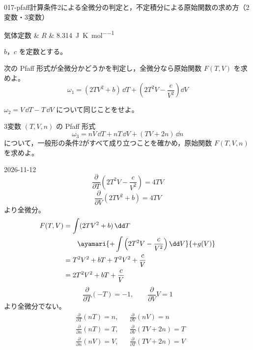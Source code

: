 \documentclass[uplatex,dvipdfmx,a4paper,11pt]{jsarticle}
\begin{document}
\begin{mondai}{017-pfaff}{計算}{条件2による全微分の判定と，不定積分による原始関数の求め方（2変数・3変数）}
\begin{teisuu}
  気体定数 & $R$ & \qty{8.314}{\joule\per\kelvin\per\mole}\\
\end{teisuu}
$b$，$c$ を定数とする。
  \begin{shoumon}
    \item 次の Pfaff 形式が全微分かどうかを判定し，全微分なら原始関数 $F(T,V)$ を求めよ。
    \[ \omega_{1} = (2TV^{2} + b)\,\dd T + \left(2T^{2}V - \frac{c}{V^{2}}\right)\dd V \]
    \item $\omega_{2} = V\,\dd T - T\,\dd V$ について同じことをせよ。
    \item 3変数 $(T,V,n)$ の Pfaff 形式
    \[ \omega_{3} = nV\,\dd T + nT\,\dd V + (TV + 2n)\,\dd n \]
    について，一般形の条件2がすべて成り立つことを確かめ，原始関数 $F(T,V,n)$ を求めよ。
  \end{shoumon}
\begin{kotaeutsushi}{2026-11-12}
\[ \frac{\partial}{\partial T}\left(2T^{2}V-\frac{c}{V^{2}}\right)=4TV \]
\[ \frac{\partial}{\partial V}(2TV^{2}+b)=4TV \]
より全微分。
\begin{align*}
F(T,V)&=\int(2TV^{2}+b)\,\dd T\\
&\qquad\ayamari{+\int\left(2T^{2}V-\frac{c}{V^{2}}\right)\dd V}{+g(V)}\\
&=T^{2}V^{2}+bT+T^{2}V^{2}+\frac{c}{V}\\
&=2T^{2}V^{2}+bT+\frac{c}{V}
\end{align*}
\[ \frac{\partial}{\partial T}(-T)=-1, \qquad \frac{\partial}{\partial V}V=1 \]
より全微分でない。
\begin{align*}
&\frac{\partial}{\partial T}(nT)=n, && \frac{\partial}{\partial V}(nV)=n\\
&\frac{\partial}{\partial n}(nT)=T, && \frac{\partial}{\partial V}(TV+2n)=T\\
&\frac{\partial}{\partial n}(nV)=V, && \frac{\partial}{\partial T}(TV+2n)=V

\end{align*}
\end{kotaeutsushi}
\end{mondai}
\end{document}
